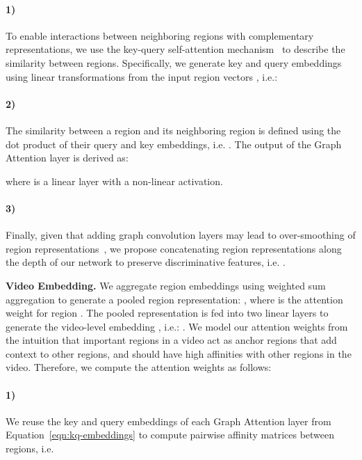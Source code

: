 \documentclass[letterpaper]{article} \usepackage{aaai22}  \usepackage{times}  \usepackage{helvet}  \usepackage{courier}  \usepackage[hyphens]{url}  \usepackage{graphicx} \urlstyle{rm} \usepackage{amsmath}
\begin{document}
\paragraph{1)} To enable interactions between neighboring regions with complementary representations, we use the key-query self-attention mechanism~\cite{attention-is-all-you-need} to describe the similarity between regions. Specifically, we generate key and query embeddings using linear transformations from the input region vectors , i.e.:


\vspace{-2mm}
\paragraph{2)} The similarity between a region  and its neighboring region  is defined using the dot product of their query and key embeddings, i.e. . The output of the Graph Attention layer  is derived as:

where  is a linear layer with a non-linear activation.

\vspace{-2mm}
\paragraph{3)} Finally, given that adding graph convolution layers may lead to over-smoothing of region representations~\cite{gcn:over-smoothing1, chen2019measuring}, we propose concatenating region representations along the depth of our network to preserve discriminative features, i.e. .

\textbf{Video Embedding.} We aggregate region embeddings  using weighted sum aggregation to generate a pooled region representation:
,
where  is the attention weight for region . The pooled representation  is fed into two linear layers to generate the video-level embedding , i.e.: . We model our attention weights  from the intuition that important regions in a video act as anchor regions that add context to other regions, and should have high affinities with other regions in the video. Therefore, we compute the attention weights  as follows:
\vspace{-2mm}
\paragraph{1)} We reuse the key and query embeddings of each Graph Attention layer  from Equation~\ref{eqn:kq-embeddings} to compute  pairwise affinity matrices  between regions, i.e.
\end{document}
